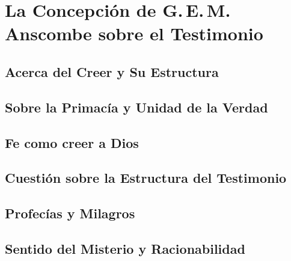 \documentclass[./main.tex]{subfiles}
\begin{document}



%

%

%

%

\chapter{La Concepción de G.\,E.\,M.\,Anscombe sobre el Testimonio}

\section{Acerca del Creer y Su Estructura}

\section{Sobre la Primacía y Unidad de la Verdad}
%
\section{Fe como creer a Dios}
%
\section{Cuestión sobre la Estructura del Testimonio}

\section{Profecías y Milagros}

\section{Sentido del Misterio y Racionabilidad}
\end{document}
